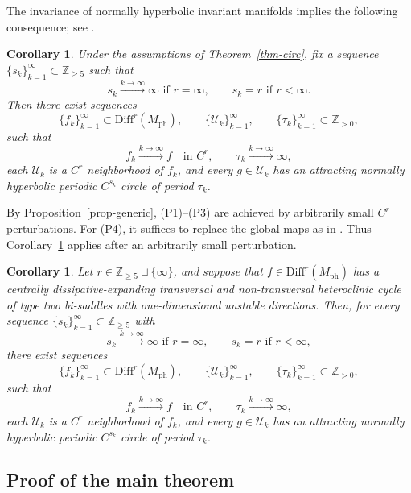 \documentclass[11pt,a4paper]{article}
\theoremstyle{plain}
\newtheorem{corollary}[theorem]{Corollary}
\theoremstyle{definition}
\theoremstyle{plain}
\numberwithin{equation}{section}
\begin{document}
The invariance of normally hyperbolic invariant manifolds implies the following consequence; see \cite{HPS1977}.

\begin{corollary}
\label{cor-circ}
Under the assumptions of Theorem~\ref{thm-circ}, fix a sequence $\{s_k\}_{k=1}^\infty \subset \mathbb{Z}_{\ge 5}$ such that
\[
s_k \xrightarrow{k\to\infty} \infty \text{ if } r = \infty,
\qquad
s_k = r \text{ if } r < \infty.
\]
Then there exist sequences
\[
\{f_k\}_{k=1}^\infty \subset \mathrm{Diff}^r(M_\mathrm{ph}),
\qquad
\{\mathcal{U}_k\}_{k=1}^\infty,
\qquad
\{\tau_k\}_{k=1}^\infty \subset \mathbb{Z}_{>0},
\]
such that
\[
f_k \xrightarrow{k\to\infty} f \quad \text{in } C^r,
\qquad
\tau_k \xrightarrow{k\to\infty} \infty,
\]
each $\mathcal{U}_k$ is a $C^r$ neighborhood of $f_k$, and every $g \in \mathcal{U}_k$ has an attracting normally hyperbolic periodic $C^{s_k}$ circle of period $\tau_k$.
\end{corollary}

By Proposition~\ref{prop-generic}, \textup{(P1)}--\textup{(P3)} are achieved by arbitrarily small $C^r$ perturbations. For \textup{(P4)}, it suffices to replace the global maps as in \cite[Section~4]{GSS2002}. Thus Corollary~\ref{cor-circ} applies after an arbitrarily small perturbation.

\begin{corollary}
\label{cor-main-from-circ}
Let $r \in \mathbb{Z}_{\ge 5} \sqcup \{\infty\}$, and suppose that $f \in \mathrm{Diff}^r(M_\mathrm{ph})$ has a centrally dissipative-expanding transversal and non-transversal heteroclinic cycle of type two bi-saddles with one-dimensional unstable directions. Then, for every sequence $\{s_k\}_{k=1}^\infty \subset \mathbb{Z}_{\ge 5}$ with
\[
s_k \xrightarrow{k\to\infty} \infty \text{ if } r = \infty,
\qquad
s_k = r \text{ if } r < \infty,
\]
there exist sequences
\[
\{f_k\}_{k=1}^\infty \subset \mathrm{Diff}^r(M_\mathrm{ph}),
\qquad
\{\mathcal{U}_k\}_{k=1}^\infty,
\qquad
\{\tau_k\}_{k=1}^\infty \subset \mathbb{Z}_{>0},
\]
such that
\[
f_k \xrightarrow{k\to\infty} f \quad \text{in } C^r,
\qquad
\tau_k \xrightarrow{k\to\infty} \infty,
\]
each $\mathcal{U}_k$ is a $C^r$ neighborhood of $f_k$, and every $g \in \mathcal{U}_k$ has an attracting normally hyperbolic periodic $C^{s_k}$ circle of period $\tau_k$.
\end{corollary}

\subsection{Proof of the main theorem}
\end{document}
